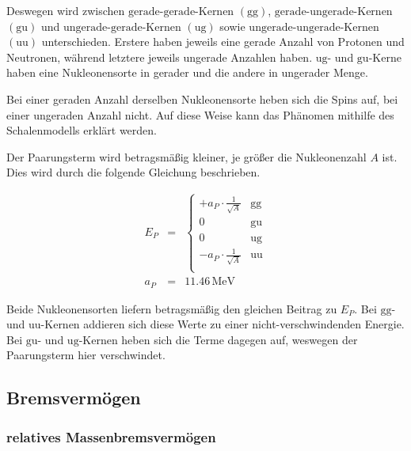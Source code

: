 \documentclass[12pt,a4paper]{scrartcl}
\numberwithin{equation}{section} %
\begin{document}
Deswegen wird zwischen $\mathrm{gerade}$-$\mathrm{gerade}$-Kernen $(\mathrm{gg})$, $\mathrm{gerade}$-$\mathrm{ungerade}$-Kernen $(\mathrm{gu})$ und $\mathrm{ungerade}$-$\mathrm{gerade}$-Kernen $(\mathrm{ug})$ sowie $\mathrm{ungerade}$-$\mathrm{ungerade}$-Kernen $(\mathrm{uu})$ unterschieden. Erstere haben jeweils eine gerade Anzahl von Protonen und Neutronen, während letztere jeweils ungerade Anzahlen haben. $\mathrm{ug}$- und $\mathrm{gu}$-Kerne haben eine Nukleonensorte in gerader und die andere in ungerader Menge.

Bei einer geraden Anzahl derselben Nukleonensorte heben sich die Spins auf, bei einer ungeraden Anzahl nicht. Auf diese Weise kann das Phänomen mithilfe des Schalenmodells erklärt werden.

Der Paarungsterm wird betragsmäßig kleiner, je größer die Nukleonenzahl $A$ ist. Dies wird durch die folgende Gleichung beschrieben.

\begin{eqnarray}
    E_P &=&
        \begin{cases}
            + a_P\cdot \frac{1}{\sqrt{A}} & \text{gg} \\
            0 & \text{gu} \\
            0 & \text{ug} \\
            - a_P\cdot \frac{1}{\sqrt{A}} & \text{uu} \\
        \end{cases}
        \label{Paarungsterm} \\
    a_P &=& 11.46\mathrm{\,MeV}
\end{eqnarray}

Beide Nukleonensorten liefern betragsmäßig den gleichen Beitrag zu $E_P$. Bei $\mathrm{gg}$- und $\mathrm{uu}$-Kernen addieren sich diese Werte zu einer nicht-verschwindenden Energie. Bei $\mathrm{gu}$- und $\mathrm{ug}$-Kernen heben sich die Terme dagegen auf, weswegen der Paarungsterm hier verschwindet.

\hypertarget{bremsvermuxf6gen}{%
\subsection{Bremsvermögen}\label{bremsvermuxf6gen}}

\hypertarget{relatives-massenbremsvermuxf6gen}{%
	\subsubsection{relatives
		Massenbremsvermögen}\label{relatives-massenbremsvermuxf6gen}}
\end{document}
